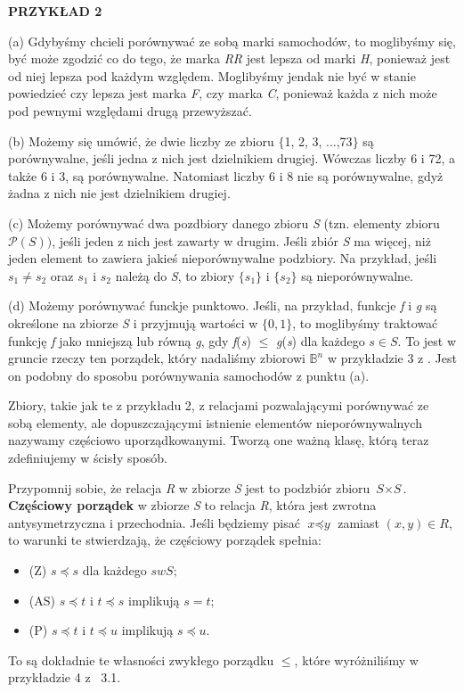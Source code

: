 \documentclass[14pt]{extarticle}
\begin{document}
\textbf{PRZYKŁAD 2}
\begin{changemargin}{160pt}{0pt} 
\qquad (a) Gdybyśmy chcieli porównywać ze sobą marki samochodów, to moglibyśmy się, być może zgodzić co do tego, że marka \textit{RR} jest lepsza od marki \textit{H}, ponieważ jest od niej lepsza pod każdym względem. Moglibyśmy jendak nie być w stanie powiedzieć czy lepsza jest marka \textit{F}, czy marka \textit{C}, ponieważ każda z nich może pod pewnymi względami drugą przewyższać.

\qquad (b) Możemy się umówić, że dwie liczby ze zbioru 
$\{$1, 2, 3, ...,73$\}$ są porównywalne, jeśli jedna z nich jest dzielnikiem drugiej. Wówczas liczby 6 i 72, a także 6 i 3, są porównywalne. Natomiast liczby 6 i 8 nie są porównywalne, gdyż żadna z nich nie jest dzielnikiem drugiej.

\qquad (c) Możemy porównywać dwa pozdbiory danego zbioru \textit{S} (tzn. elementy zbioru $\mathcal{P}(\mathit{S}))$, jeśli jeden z nich jest zawarty w drugim. 
Jeśli zbiór \textit{S} ma więcej, niż jeden element to zawiera jakieś nieporównywalne podzbiory. Na przykład, jeśli $s_{1} \ne s_{2}$ oraz $s_{1}$ i $s_{2}$ należą do \textit{S}, to zbiory $\{s_{1}\}$ i $\{s_{2}\}$ są nieporównywalne.

\qquad (d) Możemy porównywać funckje punktowo. Jeśli, na przykład, funkcje \textit{f} i \textit{g} są określone na zbiorze \textit{S} i przyjmują wartości w $\{0, 1\}$, to moglibyśmy traktować funkcję \textit{f} jako mniejszą lub równą \textit{g}, gdy \textit{f}(\textit{s}) $\le$ \textit{g}(\textit{s}) dla każdego $\mathit{s} \in \mathit{S}$. To jest w gruncie rzeczy ten porządek, który nadaliśmy zbiorowi $\mathbb{B}^{n}$ w przykładzie 3 z . Jest on podobny do sposobu porównywania samochodów z punktu (a).

\qquad Zbiory, takie jak te z przykładu 2, z relacjami pozwalającymi porównywać ze sobą elementy, ale dopuszczającymi istnienie elementów nieporównywalnych nazywamy częściowo uporządkowanymi. Tworzą one ważną klasę, którą teraz zdefiniujemy w ścisły sposób.

\qquad Przypomnij sobie, że relacja \textit{R} w zbiorze \textit{S} jest to podzbiór
zbioru $\textit{S} \times \textit{S}$. \textbf{Częściowy porządek} w zbiorze \textit{S} to relacja \textit{R}, która jest zwrotna antysymetrzyczna i przechodnia. Jeśli będziemy pisać $\textit{x} \preceq \textit{y}$ zamiast $(\textit{x},\textit{y}) \in \textit{R}$, to warunki te stwierdzają, że częściowy porządek spełnia:
\begin{itemize}
    \item[] (Z) \quad $\mathit{s} \preceq \mathit{s}$ dla każdego $\mathit{s} w \mathit{S};$
    \item[] (AS) \quad  $\mathit{s} \preceq \mathit{t}$ i $\mathit{t} \preceq \mathit{s}$ implikują $s = t;$
    \item[] (P) \quad $\mathit{s} \preceq \mathit{t}$ i $\mathit{t} \preceq \mathit{u}$ implikują $\mathit{s} \preceq \mathit{u}$.
\end{itemize}
To są dokładnie te własności zwykłego porządku $\le$, które wyróżniliśmy w przykładzie 4 z \textsection ~3.1.



\end{changemargin}
\end{document}
